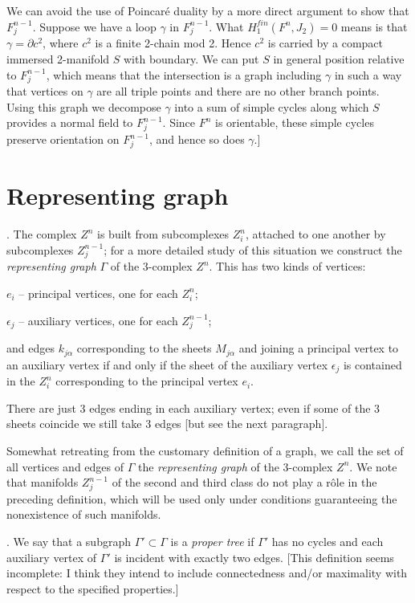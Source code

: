 \documentclass{amsart}
\theoremstyle{plain}
\theoremstyle{definition}
\begin{document}
We can avoid the use of Poincar\'e duality by a more direct
argument to show that $F^{n-1}_j$. Suppose we have a loop
$\gamma$ in $F^{n-1}_j$. What $H^{fin}_1(F^n,J_2) = 0$ means
is that $\gamma = \partial c^2$, where $c^2$ is a finite 2-chain
mod 2. Hence $c^2$ is carried by a compact immersed 2-manifold
$S$ with boundary. We can put $S$ in general position relative
to $F^{n-1}_j$, which means that the intersection is a graph
including $\gamma$ in such a way that vertices on $\gamma$
are all triple points and there are no other branch points. Using
this graph we decompose $\gamma$ into a sum of simple cycles
along which $S$ provides a normal field to $F^{n-1}_j$. Since
$F^n$ is orientable, these simple cycles preserve orientation
on $F^{n-1}_j$, and hence so does $\gamma$.]

\section{Representing graph}\label{sec:graph}
. The complex $Z^n$ is built from subcomplexes $Z^n_i$,
attached to one another by subcomplexes $Z^{n-1}_j$; for a more
detailed study of this situation we construct the {\em representing
graph} $\Gamma$ of the 3-complex $Z^n$. This has two kinds of vertices:

$e_i$ -- principal vertices, one for each $Z^n_i$;

$\epsilon_j$ -- auxiliary vertices, one for each $Z^{n-1}_j$;

\noindent and edges $k_{j\alpha}$ corresponding to the sheets
$M_{j\alpha}$ and joining a principal vertex to an auxiliary
vertex if and only if the sheet of the auxiliary vertex
$\epsilon_j$ is contained in the $Z^n_i$ corresponding to the
principal vertex $e_i$.

There are just 3 edges ending in each auxiliary vertex; even
if some of the 3 sheets coincide we still take 3 edges [but see
the next paragraph].

Somewhat retreating from the customary definition of a graph,
we call the set of all vertices and edges of $\Gamma$ the
{\em representing graph} of the 3-complex $Z^n$. We note that
manifolds $Z^{n-1}_j$ of the second and third class do not
play a r\^ole in the preceding definition, which will be used
only under conditions guaranteeing the nonexistence of such
manifolds.

. We say that a subgraph $\Gamma' \subset \Gamma$ is a
{\em proper tree} if $\Gamma'$ has no cycles and each auxiliary
vertex of $\Gamma'$ is incident with exactly two edges.
[This definition seems incomplete: I think they intend to
include connectedness and/or maximality with respect to
the specified properties.]
\end{document}
